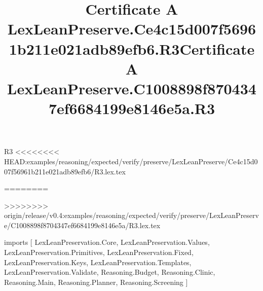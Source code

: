 \begin{lexlean}{R3}
<<<<<<<< HEAD:examples/reasoning/expected/verify/preserve/LexLeanPreserve/Ce4c15d007f56961b211e021adb89efb6/R3.lex.tex
\title{Certificate A LexLeanPreserve.Ce4c15d007f56961b211e021adb89efb6.R3}
========
\title{Certificate A LexLeanPreserve.C1008898f8704347ef6684199e8146e5a.R3}
>>>>>>>> origin/release/v0.4:examples/reasoning/expected/verify/preserve/LexLeanPreserve/C1008898f8704347ef6684199e8146e5a/R3.lex.tex
\begin{coremodule}
imports [
  LexLeanPreservation.Core,
  LexLeanPreservation.Values,
  LexLeanPreservation.Primitives,
  LexLeanPreservation.Fixed,
  LexLeanPreservation.Keys,
  LexLeanPreservation.Templates,
  LexLeanPreservation.Validate,
  Reasoning.Budget,
  Reasoning.Clinic,
  Reasoning.Main,
  Reasoning.Planner,
  Reasoning.Screening
]


\end{coremodule}
\end{lexlean}
